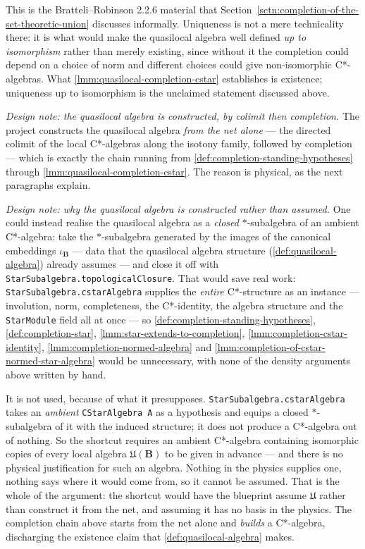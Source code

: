 This is the Bratteli--Robinson 2.2.6 material that Section~\ref{sctn:completion-of-the-set-theoretic-union} discusses informally. Uniqueness is not a mere technicality there: it is what would make the quasilocal algebra well defined \emph{up to isomorphism} rather than merely existing, since without it the completion could depend on a choice of norm and different choices could give non-isomorphic C*-algebras. What \ref{lmm:quasilocal-completion-cstar} establishes is existence; uniqueness up to isomorphism is the unclaimed statement discussed above.

\emph{Design note: the quasilocal algebra is constructed, by colimit then completion.} The project constructs the quasilocal algebra \emph{from the net alone} --- the directed colimit of the local C*-algebras along the isotony family, followed by completion --- which is exactly the chain running from \ref{def:completion-standing-hypotheses} through \ref{lmm:quasilocal-completion-cstar}. The reason is physical, as the next paragraphs explain.

\emph{Design note: why the quasilocal algebra is constructed rather than assumed.} One could instead realise the quasilocal algebra as a \emph{closed} $*$-subalgebra of an ambient C*-algebra: take the $*$-subalgebra generated by the images of the canonical embeddings $\iota_{\mathbf{B}}$ --- data that the quasilocal algebra structure (\ref{def:quasilocal-algebra}) already assumes --- and close it off with \texttt{StarSubalgebra.topologicalClosure}. That would save real work: \texttt{StarSubalgebra.cstarAlgebra} supplies the \emph{entire} C*-structure as an instance --- involution, norm, completeness, the C*-identity, the algebra structure and the \texttt{StarModule} field all at once --- so \ref{def:completion-standing-hypotheses}, \ref{def:completion-star}, \ref{lmm:star-extends-to-completion}, \ref{lmm:completion-cstar-identity}, \ref{lmm:completion-normed-algebra} and \ref{lmm:completion-of-cstar-normed-star-algebra} would be unnecessary, with none of the density arguments above written by hand.

It is not used, because of what it presupposes. \texttt{StarSubalgebra.cstarAlgebra} takes an \emph{ambient} \texttt{CStarAlgebra A} as a hypothesis and equips a closed $*$-subalgebra of it with the induced structure; it does not produce a C*-algebra out of nothing. So the shortcut requires an ambient C*-algebra containing isomorphic copies of every local algebra $\mathfrak{U}(\mathbf{B})$ to be given in advance --- and there is no physical justification for such an algebra. Nothing in the physics supplies one, nothing says where it would come from, so it cannot be assumed. That is the whole of the argument: the shortcut would have the blueprint assume $\mathfrak{U}$ rather than construct it from the net, and assuming it has no basis in the physics. The completion chain above starts from the net alone and \emph{builds} a C*-algebra, discharging the existence claim that \ref{def:quasilocal-algebra} makes.

